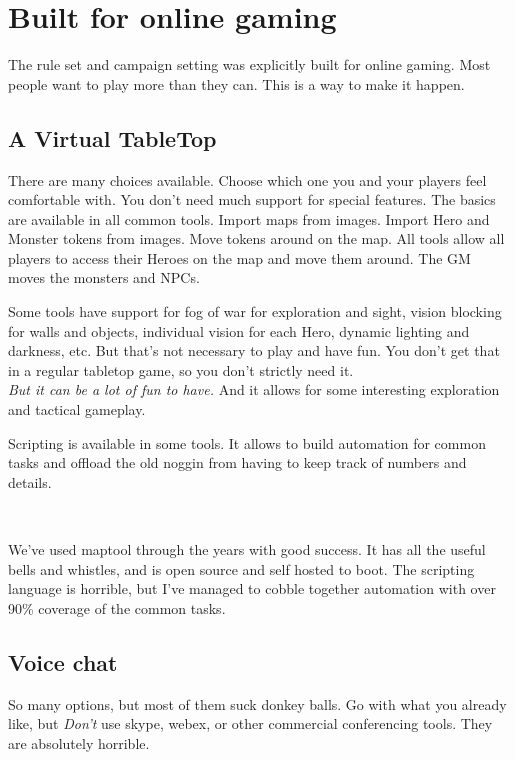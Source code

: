 \clearpage %

\section*{Built for online gaming}

The rule set and campaign setting was explicitly built for online gaming. Most people want to play more than they can. This is a way to make it happen.


\subsection*{A Virtual TableTop}

There are many choices available. Choose which one you and your players feel comfortable with. You don't need much support for special features. The basics are available in all common tools. Import maps from images. Import Hero and Monster tokens from images. Move tokens around on the map. All tools allow all players to access their Heroes on the map and move them around. The GM moves the monsters and NPCs. 

Some tools have support for fog of war for exploration and sight, vision blocking for walls and objects, individual vision for each Hero, dynamic lighting and darkness, etc. But that's not necessary to play and have fun. You don't get that in a regular tabletop game, so you don't strictly need it.\\
\emph{But it can be a lot of fun to have.} And it allows for some interesting exploration and tactical gameplay. 

Scripting is available in some tools. It allows to build automation for common tasks and offload the old noggin from having to keep track of numbers and details.

\

We've used maptool through the years with good success. It has all the useful bells and whistles, and is open source and self hosted to boot. The scripting language is horrible, but I've managed to cobble together automation with over 90\% coverage of the common tasks.


\subsection*{Voice chat}

So many options, but most of them suck donkey balls. Go with what you already like, but \emph{Don't} use skype, webex, or other commercial conferencing tools. They are absolutely horrible.

